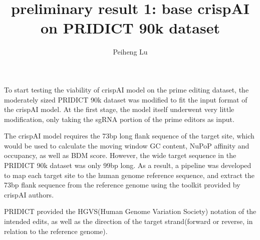 \documentclass[a4,12pt]{article}
\title{preliminary result 1: base crispAI on PRIDICT 90k dataset}
\author{Peiheng Lu}
\begin{document}
\maketitle

To start testing the viability of crispAI model on the prime editing dataset, the moderately sized PRIDICT 90k dataset was modified to fit the input format of the crispAI model. At the first stage, the model itself underwent very little modification, only taking the sgRNA portion of the prime editors as input. 

The crispAI model requires the 73bp long flank sequence of the target site, which would be used to calculate the moving window GC content, NuPoP affinity and occupancy, as well as BDM score\cite{stortzPiCRISPRPhysicallyInformed2023}. However, the wide target sequence in the PRIDICT 90k dataset was only 99bp long. As a result, a pipeline was developed to map each target site to the human genome reference sequence, and extract the 73bp flank sequence from the reference genome using the toolkit provided by crispAI authors.

PRIDICT provided the HGVS(Human Genome Variation Society) notation of the intended edits, as well as the direction of the target strand(forward or reverse, in relation to the reference genome). 

\printbibliography
\end{document}
